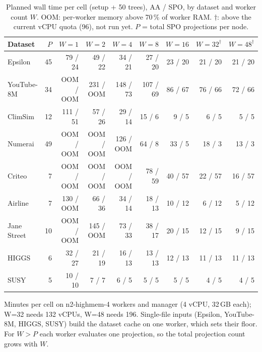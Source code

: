 \begin{table}[t]
\centering\footnotesize\setlength{\tabcolsep}{3.5pt}
\caption{Planned wall time per cell (setup + 50 trees), AA / SPO, by dataset and worker count $W$. OOM: per-worker memory above 70\,\% of worker RAM. $\dagger$: above the current vCPU quota (96), not run yet. $P$ = total SPO projections per node.}
\label{tab:planned-runtime}
\begin{tabular}{l r|rrrrrrr}
\toprule
Dataset & $P$ & $W=1$ & $W=2$ & $W=4$ & $W=8$ & $W=16$ & $W=32^\dagger$ & $W=48^\dagger$ \\
\midrule
Epsilon & 45 & 79 / 24 & 49 / 22 & 34 / 21 & 27 / 20 & 23 / 20 & 21 / 20 & 21 / 20 \\
YouTube-8M & 34 & OOM / OOM & 231 / OOM & 148 / 73 & 107 / 69 & 86 / 67 & 76 / 66 & 72 / 66 \\
ClimSim & 12 & 111 / 51 & 57 / 26 & 29 / 14 & 15 / 6 & 9 / 5 & 6 / 5 & 5 / 5 \\
Numerai & 49 & OOM / OOM & OOM / OOM & 126 / OOM & 64 / 8 & 33 / 5 & 18 / 3 & 13 / 3 \\
Criteo & 7 & OOM / OOM & OOM / OOM & OOM / OOM & 78 / 59 & 40 / 57 & 22 / 57 & 16 / 57 \\
Airline & 7 & 130 / OOM & 66 / 36 & 34 / 14 & 18 / 13 & 10 / 12 & 6 / 12 & 5 / 12 \\
Jane Street & 10 & OOM / OOM & 145 / OOM & 73 / 33 & 38 / 17 & 20 / 15 & 12 / 15 & 9 / 15 \\
HIGGS & 6 & 32 / 27 & 21 / 19 & 16 / 13 & 13 / 13 & 12 / 13 & 11 / 13 & 11 / 13 \\
SUSY & 5 & 10 / 10 & 7 / 7 & 6 / 5 & 5 / 5 & 5 / 5 & 4 / 5 & 4 / 5 \\
\bottomrule
\end{tabular}
\par\smallskip\footnotesize Minutes per cell on n2-highmem-4 workers and manager (4 vCPU, 32\,GB each); W=32 needs 132 vCPUs, W=48 needs 196. Single-file inputs (Epsilon, YouTube-8M, HIGGS, SUSY) build the dataset cache on one worker, which sets their floor. For $W > P$ each worker evaluates one projection, so the total projection count grows with $W$.
\end{table}
